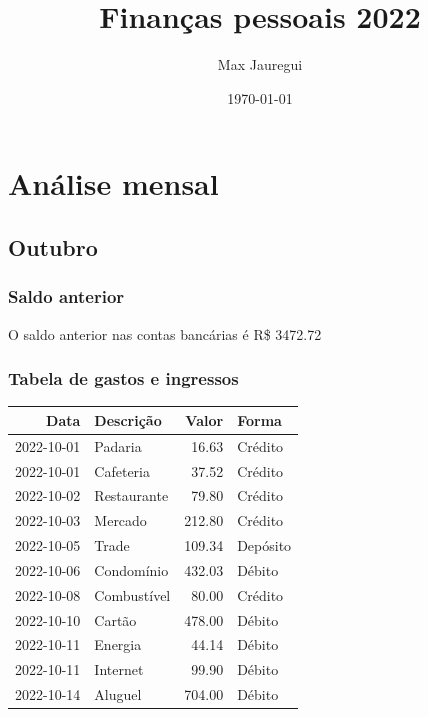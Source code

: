 \documentclass[11pt]{article}
\author{Max Jauregui}
\date{\today}
\title{Finanças pessoais 2022}
\begin{document}
\maketitle
\setcounter{tocdepth}{2}
\tableofcontents


\section{Análise mensal}
\label{sec:org8afaf8c}

\subsection{Outubro}
\label{sec:org8bfed6d}

\subsubsection{Saldo anterior}
\label{sec:org33a9aec}

O saldo anterior nas contas bancárias é R\$ 3472.72

\subsubsection{Tabela de gastos e ingressos}
\label{sec:org94e4375}

\begin{center}
\begin{tabular}{rlrl}
Data & Descrição & Valor & Forma\\
\hline
2022-10-01 & Padaria & 16.63 & Crédito\\
2022-10-01 & Cafeteria & 37.52 & Crédito\\
2022-10-02 & Restaurante & 79.80 & Crédito\\
2022-10-03 & Mercado & 212.80 & Crédito\\
2022-10-05 & Trade & 109.34 & Depósito\\
2022-10-06 & Condomínio & 432.03 & Débito\\
2022-10-08 & Combustível & 80.00 & Crédito\\
2022-10-10 & Cartão & 478.00 & Débito\\
2022-10-11 & Energia & 44.14 & Débito\\
2022-10-11 & Internet & 99.90 & Débito\\
2022-10-14 & Aluguel & 704.00 & Débito\\
\end{tabular}
\end{center}
\end{document}
